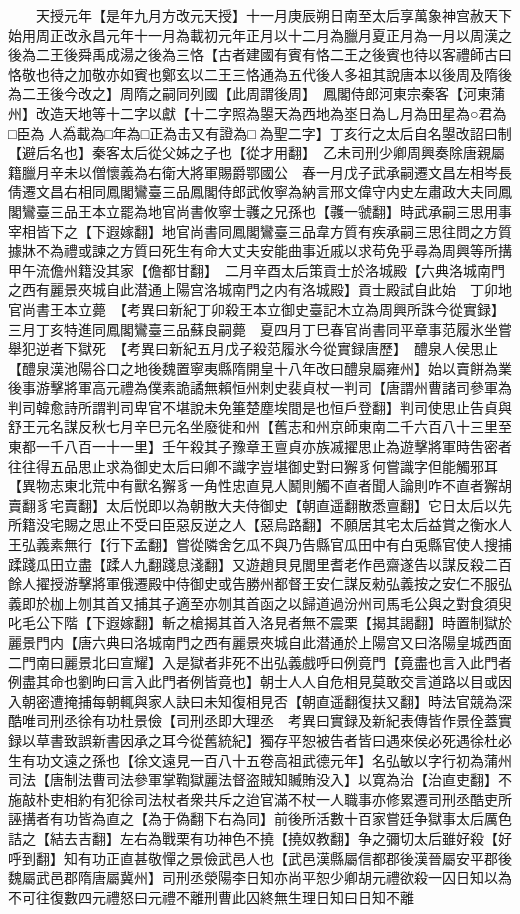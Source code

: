 　　天授元年【是年九月方改元天授】十一月庚辰朔日南至太后享萬象神宫赦天下始用周正改永昌元年十一月為載初元年正月以十二月為臘月夏正月為一月以周漢之後為二王後舜禹成湯之後為三恪【古者建國有賓有恪二王之後賓也待以客禮師古曰恪敬也待之加敬亦如賓也鄭玄以二王三恪通為五代後人多祖其說唐本以後周及隋後為二王後今改之】周隋之嗣同列國【此周謂後周】　鳳閣侍郎河東宗秦客【河東蒲州】改造天地等十二字以獻【十二字照為曌天為西地為埊日為乚月為田星為○君為□臣為人為載為□年為□正為击又有證為□為聖二字】丁亥行之太后自名曌改詔曰制【避后名也】秦客太后從父姊之子也【從才用翻】　乙未司刑少卿周興奏除唐親屬籍臘月辛未以僧懷義為右衛大將軍賜爵鄂國公　春一月戊子武承嗣遷文昌左相岑長倩遷文昌右相同鳳閣鸞臺三品鳳閣侍郎武攸寧為納言邢文偉守内史左肅政大夫同鳳閣鸞臺三品王本立罷為地官尚書攸寧士彠之兄孫也【彠一虢翻】時武承嗣三思用事宰相皆下之【下遐嫁翻】地官尚書同鳳閣鸞臺三品韋方質有疾承嗣三思往問之方質據牀不為禮或諫之方質曰死生有命大丈夫安能曲事近戚以求苟免乎尋為周興等所搆甲午流儋州籍没其家【儋都甘翻】　二月辛酉太后策貢士於洛城殿【六典洛城南門之西有麗景夾城自此潜通上陽宫洛城南門之内有洛城殿】貢士殿試自此始　丁卯地官尚書王本立薨　【考異曰新紀丁卯殺王本立御史臺記木立為周興所誅今從實録】　三月丁亥特進同鳳閣鸞臺三品蘇良嗣薨　夏四月丁巳春官尚書同平章事范履氷坐嘗舉犯逆者下獄死　【考異曰新紀五月戊子殺范履氷今從實録唐歷】　醴泉人侯思止【醴泉漢池陽谷口之地後魏置寧夷縣隋開皇十八年改曰醴泉屬雍州】始以賣餅為業後事游擊將軍高元禮為僕素詭譎無賴恒州刺史裴貞杖一判司【唐謂州曹諸司參軍為判司韓愈詩所謂判司卑官不堪說未免箠楚塵埃間是也恒戶登翻】判司使思止告貞與舒王元名謀反秋七月辛巳元名坐廢徙和州【舊志和州京師東南二千六百八十三里至東都一千八百一十一里】壬午殺其子豫章王亶貞亦族㓕擢思止為遊擊將軍時吿密者往往得五品思止求為御史太后曰卿不識字豈堪御史對曰獬豸何嘗識字但能觸邪耳【異物志東北荒中有獸名獬豸一角性忠直見人鬭則觸不直者聞人論則咋不直者獬胡賣翻豸宅賣翻】太后悦即以為朝散大夫侍御史【朝直遥翻散悉亶翻】它日太后以先所籍没宅賜之思止不受曰臣惡反逆之人【惡烏路翻】不願居其宅太后益賞之衡水人王弘義素無行【行下孟翻】嘗從隣舍乞瓜不與乃告縣官瓜田中有白兎縣官使人搜捕蹂踐瓜田立盡【蹂人九翻踐息淺翻】又遊趙貝見閭里耆老作邑齋遂告以謀反殺二百餘人擢授游擊將軍俄遷殿中侍御史或告勝州都督王安仁謀反勑弘義按之安仁不服弘義即於枷上刎其首又捕其子適至亦刎其首函之以歸道過汾州司馬毛公與之對食須臾叱毛公下階【下遐嫁翻】斬之槍揭其首入洛見者無不震栗【揭其謁翻】時置制獄於麗景門内【唐六典曰洛城南門之西有麗景夾城自此潜通於上陽宫又曰洛陽皇城西面二門南曰麗景北曰宣耀】入是獄者非死不出弘義戲呼曰例竟門【竟盡也言入此門者例盡其命也劉昫曰言入此門者例皆竟也】朝士人人自危相見莫敢交言道路以目或因入朝密遭掩捕每朝輒與家人訣曰未知復相見否【朝直遥翻復扶又翻】時法官競為深酷唯司刑丞徐有功杜景儉【司刑丞即大理丞　考異曰實録及新紀表傳皆作景佺蓋實録以草書致誤新書因承之耳今從舊統紀】獨存平恕被告者皆曰遇來侯必死遇徐杜必生有功文遠之孫也【徐文遠見一百八十五卷高祖武德元年】名弘敏以字行初為蒲州司法【唐制法曹司法參軍掌鞫獄麗法督盗賊知贓賄没入】以寛為治【治直吏翻】不施敲朴吏相約有犯徐司法杖者衆共斥之迨官滿不杖一人職事亦修累遷司刑丞酷吏所誣搆者有功皆為直之【為于偽翻下右為同】前後所活數十百家嘗廷争獄事太后厲色詰之【結去吉翻】左右為戰栗有功神色不撓【撓奴教翻】争之彌切太后雖好殺【好呼到翻】知有功正直甚敬憚之景儉武邑人也【武邑漢縣屬信都郡後漢晉屬安平郡後魏屬武邑郡隋唐屬冀州】司刑丞滎陽李日知亦尚平恕少卿胡元禮欲殺一囚日知以為不可往復數四元禮怒曰元禮不離刑曹此囚終無生理日知曰日知不離